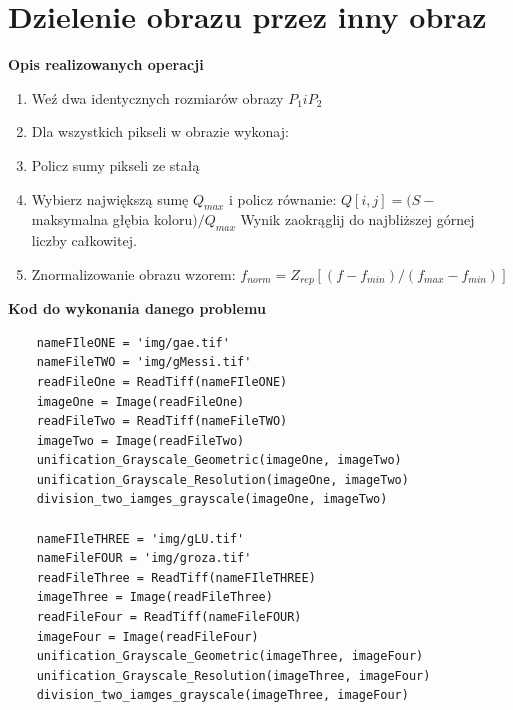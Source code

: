 \documentclass[magisterska,openany]{pracadypl}
\begin{document}
\section{Dzielenie obrazu przez inny obraz}

\textbf{\Large Opis realizowanych operacji}
\begin{enumerate}
\item Weź dwa identycznych rozmiarów obrazy $P_1 i P_2$
\item Dla wszystkich pikseli w obrazie wykonaj:  
\item Policz sumy pikseli ze stałą
\item Wybierz największą sumę $Q_{max}$ i policz równanie:
\newline $Q[i,j]=(S-$maksymalna głębia koloru$)/Q_{max}$
\newline Wynik zaokrąglij do najbliższej górnej liczby całkowitej.
\item Znormalizowanie obrazu wzorem:
\newline $f_{norm}=Z_{rep}[(f-f_{min})/(f_{max}-f_{min})]$
\end{enumerate}

\vspace{0.5cm}
\textbf{\Large Kod do wykonania danego problemu}
\lstset{language=Python}
\vspace{0.25cm}
\begin{lstlisting}
	nameFIleONE = 'img/gae.tif'
	nameFileTWO = 'img/gMessi.tif'
	readFileOne = ReadTiff(nameFIleONE)
	imageOne = Image(readFileOne)
	readFileTwo = ReadTiff(nameFileTWO)
	imageTwo = Image(readFileTwo)
	unification_Grayscale_Geometric(imageOne, imageTwo)
	unification_Grayscale_Resolution(imageOne, imageTwo) 
	division_two_iamges_grayscale(imageOne, imageTwo)
	
	nameFIleTHREE = 'img/gLU.tif'
	nameFileFOUR = 'img/groza.tif'
	readFileThree = ReadTiff(nameFIleTHREE)
	imageThree = Image(readFileThree)
	readFileFour = ReadTiff(nameFileFOUR)
	imageFour = Image(readFileFour)
	unification_Grayscale_Geometric(imageThree, imageFour)
	unification_Grayscale_Resolution(imageThree, imageFour)
	division_two_iamges_grayscale(imageThree, imageFour)

\end{lstlisting}
\end{document}
